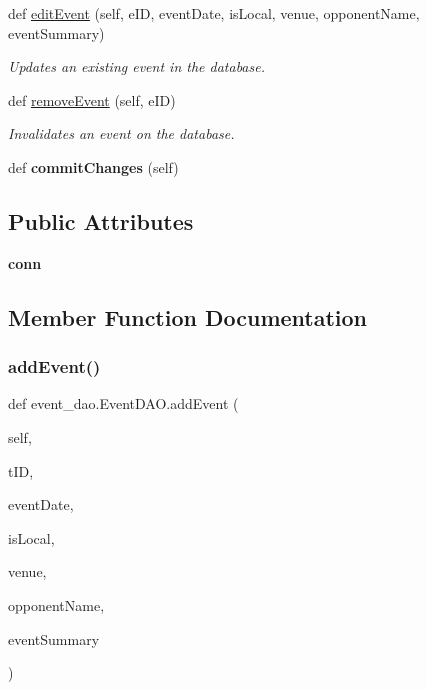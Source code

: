 \begin{DoxyCompactItemize}
def \hyperlink{classevent__dao_1_1_event_d_a_o_aa058279a0968dab7e6b610c86f920858}{edit\+Event} (self, e\+ID, event\+Date, is\+Local, venue, opponent\+Name, event\+Summary)
\begin{DoxyCompactList}\small\item\em Updates an existing event in the database. \end{DoxyCompactList}\item 
def \hyperlink{classevent__dao_1_1_event_d_a_o_ab7216495895bc8675151462570a5f6e4}{remove\+Event} (self, e\+ID)
\begin{DoxyCompactList}\small\item\em Invalidates an event on the database. \end{DoxyCompactList}\item 
\mbox{\label{classevent__dao_1_1_event_d_a_o_a0b5530ddb42d832356f25695d868f1e8}} 
def {\bfseries commit\+Changes} (self)
\end{DoxyCompactItemize}
\subsection*{Public Attributes}
\begin{DoxyCompactItemize}
\item 
\mbox{\label{classevent__dao_1_1_event_d_a_o_a7a227a229be39211441ec32f0456e9a0}} 
{\bfseries conn}
\end{DoxyCompactItemize}


\subsection{Member Function Documentation}
\mbox{\label{classevent__dao_1_1_event_d_a_o_a8c48a119d94d896c68fecb0d351a4ce3}} 
\subsubsection{\texorpdfstring{add\+Event()}{addEvent()}}
{\footnotesize\ttfamily def event\+\_\+dao.\+Event\+D\+A\+O.\+add\+Event (\begin{DoxyParamCaption}\item[{}]{self,  }\item[{}]{t\+ID,  }\item[{}]{event\+Date,  }\item[{}]{is\+Local,  }\item[{}]{venue,  }\item[{}]{opponent\+Name,  }\item[{}]{event\+Summary }\end{DoxyParamCaption})}



